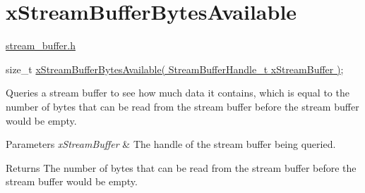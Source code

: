 \hypertarget{group__x_stream_buffer_bytes_available}{}\section{x\+Stream\+Buffer\+Bytes\+Available}
\label{group__x_stream_buffer_bytes_available}
\hyperlink{stream__buffer_8h}{stream\+\_\+buffer.\+h}


\begin{DoxyPre}
size\_t \hyperlink{stream__buffer_8h_af32d1737de29f24ee31ac1e3c407d9fd}{xStreamBufferBytesAvailable( StreamBufferHandle\_t xStreamBuffer )};
\end{DoxyPre}


Queries a stream buffer to see how much data it contains, which is equal to the number of bytes that can be read from the stream buffer before the stream buffer would be empty.


\begin{DoxyParams}{Parameters}
{\em x\+Stream\+Buffer} & The handle of the stream buffer being queried.\\
\hline
\end{DoxyParams}
\begin{DoxyReturn}{Returns}
The number of bytes that can be read from the stream buffer before the stream buffer would be empty. 
\end{DoxyReturn}

